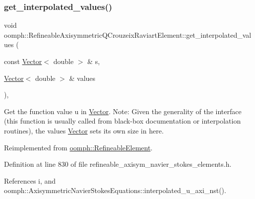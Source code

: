 \subsubsection{\texorpdfstring{get\+\_\+interpolated\+\_\+values()}{get\_interpolated\_values()}\hspace{0.1cm}{\footnotesize\ttfamily [1/2]}}
{\footnotesize\ttfamily void oomph\+::\+Refineable\+Axisymmetric\+Q\+Crouzeix\+Raviart\+Element\+::get\+\_\+interpolated\+\_\+values (\begin{DoxyParamCaption}\item[{const \hyperlink{classoomph_1_1Vector}{Vector}$<$ double $>$ \&}]{s,  }\item[{\hyperlink{classoomph_1_1Vector}{Vector}$<$ double $>$ \&}]{values }\end{DoxyParamCaption})\hspace{0.3cm}{\ttfamily [inline]}, {\ttfamily [virtual]}}



Get the function value u in \hyperlink{classoomph_1_1Vector}{Vector}. Note\+: Given the generality of the interface (this function is usually called from black-\/box documentation or interpolation routines), the values \hyperlink{classoomph_1_1Vector}{Vector} sets its own size in here. 



Reimplemented from \hyperlink{classoomph_1_1RefineableElement_ad9a4f92880668a2373326d8306365c43}{oomph\+::\+Refineable\+Element}.



Definition at line 830 of file refineable\+\_\+axisym\+\_\+navier\+\_\+stokes\+\_\+elements.\+h.



References i, and oomph\+::\+Axisymmetric\+Navier\+Stokes\+Equations\+::interpolated\+\_\+u\+\_\+axi\+\_\+nst().

\mbox{\label{classoomph_1_1RefineableAxisymmetricQCrouzeixRaviartElement_a7ac03518bc3b2941916e4306e83f4f48}} 
